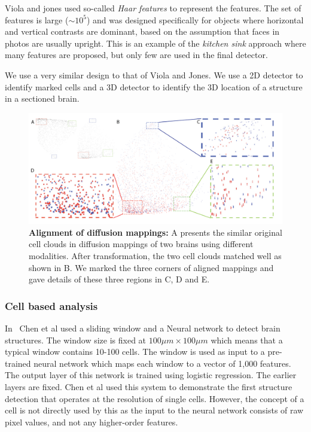 \documentclass[runningheads]{llncs}
\begin{document}
Viola and jones used so-called {\em Haar features} to represent the
features. The set of features is large ($\sim 10^5$) and was designed
specifically for objects where horizontal and vertical contrasts are
dominant, based on the assumption that faces in photos are usually
upright. This is an example of the {\em kitchen sink} approach where
many features are proposed, but only few are used in the final detector.

We use a very similar design to that of Viola and Jones. We use a 2D
detector to identify marked cells and a 3D detector to identify the 3D
location of a structure in a sectioned brain.
\begin{figure}[t]
  \includegraphics[width=\textwidth]{figures/Diffusionmap.png}
  \caption{{\bf Alignment of diffusion mappings:}  A  presents the similar original cell clouds in diffusion mappings of two brains using different modalities. After transformation, the two cell clouds matched well as shown in B. We marked the three corners of aligned mappings and gave details of these three regions in C, D and E.
}
\end{figure}

\subsubsection{Cell based analysis}

In~\cite{chen2019active} Chen et al used a sliding window and a
Neural network to detect brain structures. The window size is fixed at
$100 \mu m \times 100 \mu m$ which means that a typical window contains 10-100 cells.
The window is used as input to a pre-trained neural network which maps
each window to a vector of 1,000 features. The output layer of
this network is trained using logistic regression. The earlier layers
are fixed. Chen et al used this system to demonstrate the first
structure detection that operates at the resolution of single cells.
However, the concept of a cell is not directly used by this as the
input to the neural network consists of raw pixel values, and not any
higher-order features.
\end{document}

